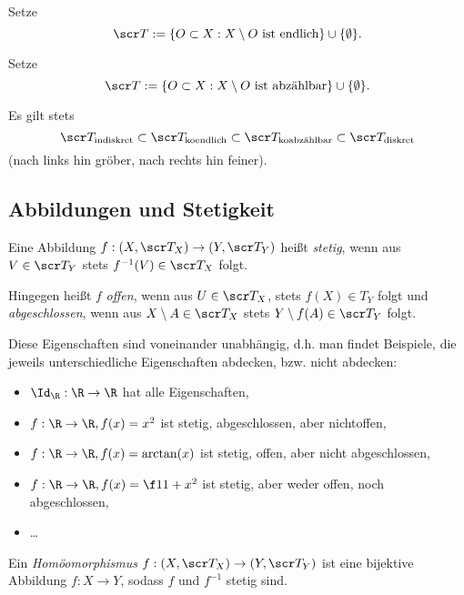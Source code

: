 \begin{ex}
	Setze
	\[
		\scr T
		:= \{ O \subset X : X \setminus O \text{ ist endlich} \} \cup \{\emptyset\}.
	\]
\end{ex}

\begin{ex}
	Setze
	\[
		\scr T
		:= \{ O \subset X : X \setminus O \text{ ist abzählbar} \} \cup \{ \emptyset \}.
	\]
\end{ex}

\begin{nt}
	Es gilt stets
	\[
		\scr T_{\text{indiskret}}
		\subset \scr T_{\text{koendlich}}
		\subset \scr T_{\text{koabzählbar}}
		\subset \scr T_{\text{diskret}}
	\]
	(nach links hin gröber, nach rechts hin feiner).
\end{nt}

\subsection{Abbildungen und Stetigkeit}

\begin{df}
	Eine Abbildung $f: (X,\scr T_X) \to (Y, \scr T_Y)$ heißt \emph{stetig}, wenn aus $V \in \scr T_Y$ stets $f^{-1}(V) \in \scr T_X$ folgt.

	Hingegen heißt $f$ \emph{offen}, wenn aus $U \in \scr T_X$, stets $f(X) \in T_Y$ folgt und \emph{abgeschlossen}, wenn aus $X \setminus A \in \scr T_X$ stets $Y \setminus f(A) \in \scr T_Y$ folgt.
	\begin{note}
		Diese Eigenschaften sind voneinander unabhängig, d.h. man findet Beispiele, die jeweils unterschiedliche Eigenschaften abdecken, bzw. nicht abdecken:
		\begin{itemize}
			\item
				$\Id_\R: \R \to \R$ hat alle Eigenschaften,
			\item
				$f: \R \to \R, f(x) = x^2$ ist stetig, abgeschlossen, aber nichtoffen,
			\item
				$f: \R \to \R, f(x) = \arctan(x)$ ist stetig, offen, aber nicht abgeschlossen,
			\item
				$f: \R \to \R, f(x) = \f 1{1+x^2}$ ist stetig, aber weder offen, noch abgeschlossen,
			\item
				\dots
		\end{itemize}
	\end{note}
\end{df}

\begin{df} \label{df:homeomorphism}
	Ein \emph{Homöomorphismus} $f: (X,\scr T_X) \to (Y, \scr T_Y)$ ist eine bijektive Abbildung $f: X \to Y$, sodass $f$ und $f^{-1}$ stetig sind.
\end{df}

